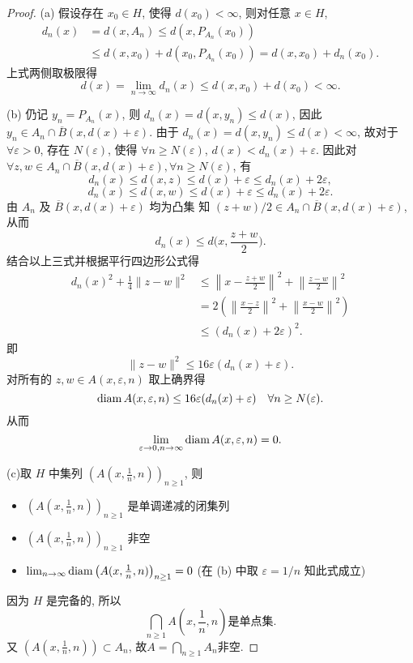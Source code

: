 \begin{proof}
  (a) 假设存在 $x_0\in H$, 使得 $d(x_0) < \infty$, 则对任意 $x\in H$,
  \begin{align*}
    d_n(x)
    & = d(x, A_n) \leq d(x, P_{A_n}(x_0)) \\
    & \leq d(x, x_0) + d(x_0, P_{A_n}(x_0)) = d(x, x_0) + d_n(x_0).
  \end{align*}
  上式两侧取极限得
  \[d(x) = \lim_{n\to\infty} d_n(x) \leq d(x,x_0) + d(x_0) < \infty.\]

  (b) 仍记 $y_n=P_{A_n}(x)$, 则 $d_n(x)=d(x,y_n)\leq d(x)$,
  因此 $y_n\in A_n\cap\overline{B}(x,d(x)+\varepsilon)$.
  由于 $d_n(x)=d(x,y_n)\leq d(x)<\infty$, 故对于 $\forall\varepsilon>0$,
  存在 $N(\varepsilon)$, 使得 $\forall n\geq N(\varepsilon)$, $d(x)<d_n(x)+\varepsilon$.
  因此对 $\forall z,w\in A_n\cap\overline{B}(x,d(x)+\varepsilon),\forall n\geq N(\varepsilon)$, 有
  \[d_n(x)\leq d(x,z)\leq d(x)+\varepsilon\leq d_n(x)+2\varepsilon,\]
  \[d_n(x)\leq d(x,w)\leq d(x)+\varepsilon\leq d_n(x)+2\varepsilon.\]
  由 $A_n$ 及 $\overline{B}(x,d(x)+\varepsilon)$ 均为凸集
  知 $(z+w)/2 \in A_n\cap\overline{B}(x,d(x)+\varepsilon)$, 从而
  \[d_n(x)\leq d\biggl(x,\frac{z+w}{2}\biggr).\]
  结合以上三式并根据平行四边形公式得
  \[\begin{split}
    d_n(x)^2+\frac{1}{4}\|z-w\|^2
    & \leq \left\|x-\frac{z+w}{2}\right\|^2+\left\|\frac{z-w}{2}\right\|^2 \\
    & = 2\left(\left\|\frac{x-z}{2}\right\|^2+\left\|\frac{x-w}{2}\right\|^2\right) \\
    & \leq (d_n(x)+2\varepsilon)^2.
  \end{split}\]
  即
  \[\|z-w\|^2\leq 16\varepsilon(d_n(x)+\varepsilon).\]
  对所有的 $z,w\in A(x,\varepsilon,n)$ 取上确界得
  \[\operatorname{diam} A(x,\varepsilon,n)\leq 16\varepsilon(d_n(x)+\varepsilon)
    \quad \forall n\geq N(\varepsilon).\]
  从而
  \[\lim\limits_{\varepsilon\to 0,n\to\infty}\operatorname{diam} A(x,\varepsilon,n) = 0.\]

  (c)取 $H$ 中集列 $\left(A(x,\frac{1}{n},n)\right)_{n\geq 1}$, 则
  \begin{itemize}
    \item $\left(A(x,\frac{1}{n},n)\right)_{n\geq 1}$ 是单调递减的闭集列
    \item $\left(A(x,\frac{1}{n},n)\right)_{n\geq 1}$ 非空
    \item $\lim_{n\to\infty}\operatorname{diam}\left(A(x,\frac{1}{n},n)\right)_{n\geq 1}=0$
      (在 (b) 中取 $\varepsilon=1/n$ 知此式成立)
  \end{itemize}
  因为 $H$ 是完备的, 所以
  \[\bigcap_{n\geq 1}A\left(x,\frac{1}{n},n\right)\text{是单点集}.\]
  又 $\left(A(x,\frac{1}{n},n)\right)\subset A_n$, 故$A=\bigcap_{n\geq 1}A_n$非空.


\end{proof}
